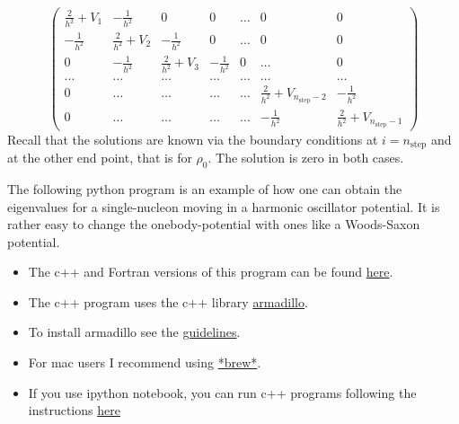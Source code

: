 \documentclass[%
twoside,                 %
final,                   %
10pt]{article}
\begin{document}
\begin{equation}
    \left( \begin{array}{ccccccc} \frac{2}{h^2}+V_1 & -\frac{1}{h^2} & 0   & 0    & \dots  &0     & 0 \\
                                -\frac{1}{h^2} & \frac{2}{h^2}+V_2 & -\frac{1}{h^2} & 0    & \dots  &0     &0 \\
                                0   & -\frac{1}{h^2} & \frac{2}{h^2}+V_3 & -\frac{1}{h^2}  &0       &\dots & 0\\
                                \dots  & \dots & \dots & \dots  &\dots      &\dots & \dots\\
                                0   & \dots & \dots & \dots  &\dots       &\frac{2}{h^2}+V_{n_{\mathrm{step}}-2} & -\frac{1}{h^2}\\
                                0   & \dots & \dots & \dots  &\dots       &-\frac{1}{h^2} & \frac{2}{h^2}+V_{n_{\mathrm{step}}-1}

             \end{array} \right)  
\label{eq:matrixse} 
\end{equation} 
Recall that the solutions are known via the boundary conditions at
$i=n_{\mathrm{step}}$ and at the other end point, that is for  $\rho_0$.
The solution is zero in both cases.



The following python program is an example of how one can obtain the eigenvalues for a single-nucleon moving in a harmonic oscillator potential. It is rather easy to change the onebody-potential with ones like a Woods-Saxon potential. 


\begin{itemize}
\item The c++ and Fortran versions of this program can be found \href{{https://github.com/NuclearStructure/PHY981/tree/master/doc/pub/spdata/programs}}{here}. 

\item The c++  program uses the c++ library \href{{http://arma.sourceforge.net/}}{armadillo}. 

\item To install armadillo see the \href{{http://www.uio.no/studier/emner/matnat/fys/FYS4411/v14/guides/installing-armadillo/}}{guidelines}. 

\item For mac users I recommend using \href{{http://brew.sh/}}{*brew*}.

\item If you use ipython notebook, you can run c++ programs following the instructions \href{{http://nbviewer.ipython.org/github/dragly/cppmagic/blob/master/example.ipynb}}{here}
\end{itemize}
\end{document}
